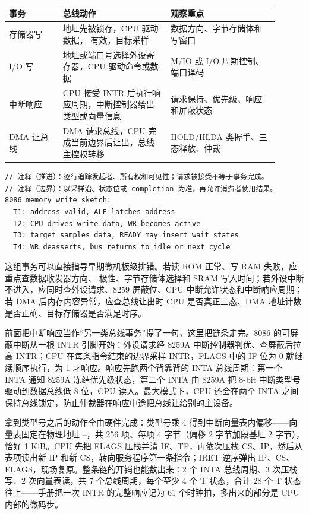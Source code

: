 \begin{longtable}{L{0.18\linewidth}L{0.36\linewidth}L{0.36\linewidth}}
\toprule
事务 & 总线动作 & 观察重点 \\
\midrule
存储器写 & 地址先被锁存，CPU 驱动数据， 有效，目标采样 & 数据方向、字节存储体和写窗口 \\\tablerowrule
I/O 写 & 地址或端口号选择外设寄存器，CPU 驱动命令或数据 & M/IO 或 I/O 周期控制、端口译码 \\\tablerowrule
中断响应 & CPU 接受 INTR 后执行响应周期，中断控制器给出类型或向量信息 & 请求保持、优先级、响应和屏蔽状态 \\\tablerowrule
DMA 让总线 & DMA 请求总线，CPU 完成当前边界后让出，总线主控权转移 & HOLD/HLDA 类握手、三态释放、仲裁 \\
\bottomrule
\end{longtable}

\begin{lstlisting}
// 注释（推进）：逐行追踪发起者、所有权和可见性；请求被接受不等于事务完成。
// 注释（边界）：以采样沿、状态位或 completion 为准，再允许消费者使用结果。
8086 memory write sketch:
  T1: address valid, ALE latches address
  T2: CPU drives write data, WR becomes active
  T3: target samples data, READY may insert wait states
  T4: WR deasserts, bus returns to idle or next cycle
\end{lstlisting}

这组事务可以直接指导早期微机板级排错。若读 ROM 正常、写 RAM 失败，应重点查数据收发器方向、 极性、字节存储体选择和 SRAM 写入时间；若外设中断不进入，应同时查外设请求、8259 屏蔽位、CPU 中断允许状态和中断响应周期；若 DMA 后内存内容异常，应查总线让出时 CPU 是否真正三态、DMA 地址计数是否正确、目标存储器是否满足时序。

前面把中断响应当作“另一类总线事务”提了一句，这里把链条走完。8086 的可屏蔽中断从一根 INTR 引脚开始：外设请求经 8259A 中断控制器判优、查屏蔽后拉高 INTR；CPU 在每条指令结束的边界采样 INTR，FLAGS 中的 IF 位为 0 就继续顺序执行，为 1 才响应。响应先跑两个背靠背的 INTA 总线周期：第一个 INTA 通知 8259A 冻结优先级状态，第二个 INTA 由 8259A 把 8-bit 中断类型号驱动到数据总线低 8 位，CPU 读入。最大模式下，CPU 还会在两个 INTA 之间保持总线锁定，防止仲裁器在响应中途把总线让给别的主设备。

拿到类型号之后的动作全由硬件完成：类型号乘 4 得到中断向量表内偏移——向量表固定在物理地址 --，共 256 项、每项 4 字节（偏移 2 字节加段基址 2 字节），恰好 1 KiB。CPU 先把 FLAGS 压栈并清 IF、TF，再依次压栈 CS、IP，然后从表项读出新 IP 和新 CS，转向服务程序第一条指令；IRET 逆序弹出 IP、CS、FLAGS，现场复原。整条链的开销也能数出来：2 个 INTA 总线周期、3 次压栈写、2 次向量表读，共 7 个总线周期，每个至少 4 个 T 状态，合计 28 个 T 状态往上——手册把一次 INTR 的完整响应记为 61 个时钟拍，多出来的部分是 CPU 内部的微码步。

